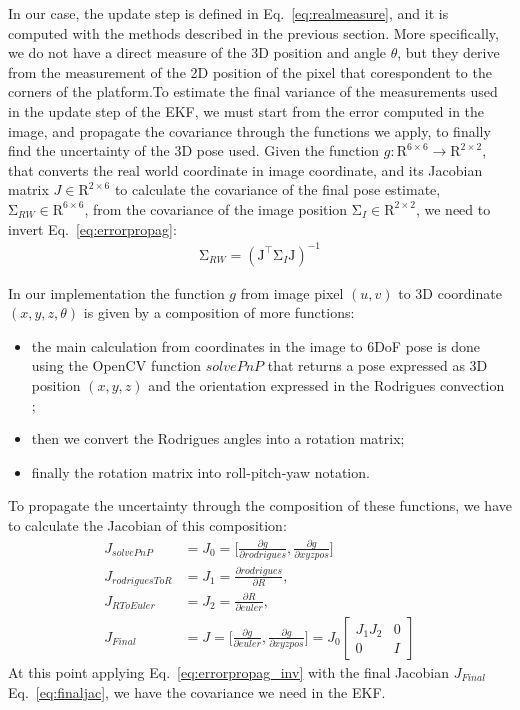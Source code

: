 In our case, the update step is defined in Eq.~\eqref{eq:realmeasure}, and it is computed with the methods described in the previous section. More specifically, we do not have a direct measure of the 3D position and angle $\theta$, but they derive from the measurement of the 2D position of the pixel that corespondent to the corners of the platform.To estimate the final variance of the measurements used in the update step of the EKF, we must start from the error computed in the image, and propagate the covariance through the functions we apply, to finally find the uncertainty of the 3D pose used. Given the function $g : \mathrm{R}^{6 \times 6} \to \mathrm{R}^{2 \times 2}$, that converts the real world coordinate in image coordinate, and its Jacobian matrix $ J \in \mathrm{R}^{2 \times 6} $ to calculate the covariance of the final pose estimate, $ \mathrm {\Sigma }_{RW} \in \mathrm{R}^{6 \times 6} $, from the covariance of the image position  $\mathrm {\Sigma }_{I} \in \mathrm{R}^{2 \times 2} $, we need to invert Eq.~\eqref{eq:errorpropag}:
\begin{align}
 \mathrm{\Sigma}_{RW} = ( \mathrm{J}^{\top} \mathrm{\Sigma }_{I} \mathrm{J})^{-1} 
\label{eq:errorpropag_inv}
\end{align}

In our implementation the function $g$ from image pixel $(u,v)$ to 3D coordinate $(x,y,z,\theta)$ is given by a composition of more functions: 
\begin{itemize}
\item the main calculation from coordinates in the image to 6DoF pose is done using the OpenCV function $solvePnP$ \cite{opencv_library} that returns a pose expressed as 3D position $(x,y,z)$ and the orientation expressed in the Rodrigues convection  \cite{belongie1999rodrigues};
\item then we convert the Rodrigues angles into a rotation matrix;
\item finally the rotation matrix into roll-pitch-yaw notation.
\end{itemize}
To propagate the uncertainty through the composition of these functions, we have to calculate the Jacobian of this composition:
\begin{subequations}
\begin{align}
J_{solvePnP} &= J_0 = \Big[ \frac  {\partial g}{\partial rodrigues},  \frac {\partial g}{\partial xyzpos} \Big] \\[10pt]
J_{rodriguesToR} &= J_1 =  \frac  {\partial rodrigues}{\partial R}, \\[10pt]
J_{RToEuler} &= J_2 =  \frac  {\partial R}{\partial euler}, \\[10pt]
J_{Final} &= J = \Big[ \frac  {\partial g}{\partial euler},  \frac {\partial g}{\partial xyzpos} \Big]  = J_{0}{\begin{bmatrix}
J_{1}J_{2} & 0 \\[10pt] 
0 & I 
\end{bmatrix}} \label{eq:finaljac}
\end{align}
\end{subequations}
At this point applying Eq.~\eqref{eq:errorpropag_inv} with the final Jacobian $J_{Final}$ Eq.~\eqref{eq:finaljac}, we have the covariance we need in the EKF.



